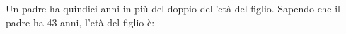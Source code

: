 Un padre ha quindici anni in più del doppio dell'età del figlio.
Sapendo che il padre ha 43 anni, l'età del figlio è: